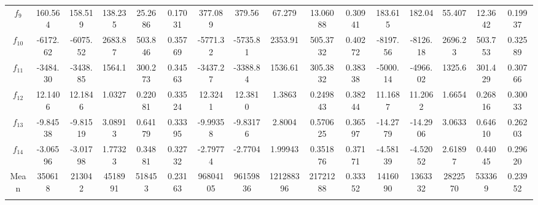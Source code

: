 \documentclass[paper=a4, fontsize=11pt]{scrartcl} %
\numberwithin{equation}{section} %
\numberwithin{figure}{section} %
\numberwithin{table}{section} %
\begin{document}
\begin{landscape}
\begin{table}
\begin{tabular}{c|ccccc|ccccc|ccccc}
			$f_{9}$  &  160.564 &  158.519 & 138.235 & 25.2686 & 0.17031 &  377.089 &  379.56  & 67.279  & 13.06088 & 0.30941 &  183.615 &  182.04  & 55.407  & 12.3642 & 0.19937\\
			$f_{10}$ & -6172.62 & -6075.52 & 2683.87 & 503.846 & 0.35769 & -5771.32 & -5735.81 & 2353.91 & 505.3732 & 0.40272 & -8197.56 & -8126.18 & 2696.23 & 503.753 & 0.32589\\
			$f_{11}$ & -3484.30 & -3438.85 & 1564.1  & 300.273 & 0.34563 & -3437.27 & -3388.84 & 1536.61 & 305.3832 & 0.38338 & -5000.14 & -4966.02 & 1325.6  & 301.429 & 0.30766\\
			$f_{12}$ &  12.1406 &  12.1846 & 1.0327  & 0.22081 & 0.33524 &  12.3241 &  12.3810 & 1.3863  & 0.249843 & 0.38244 &  11.1687 &  11.2062 & 1.6654  & 0.26816 & 0.30033\\
			$f_{13}$ & -9.84538 & -9.81519 & 3.08913 & 0.64179 & 0.33395 & -9.99358 & -9.83176 & 2.8004  & 0.570625 & 0.36597 & -14.2779 & -14.2906 & 3.0633  & 0.64610 & 0.26203\\
			$f_{14}$ & -3.06596 & -3.01798 & 1.77323 & 0.34881 & 0.32732 & -2.79774 & -2.7704  & 1.99943 & 0.351876 & 0.37171 & -4.58139 & -4.52052 & 2.61897 & 0.44045 & 0.29620\\		
			
			\noalign{\smallskip}\hline\noalign{\smallskip}
			Mean & 350618 & 213042 & 4518991 & 518453 & 0.23163 & 96804105 & 96159836 & 121288396 & 21721288 & 0.33352 & 1416090 & 1363332 & 2822570 & 533369 & 0.23952\\
			\noalign{\smallskip}\hline\noalign{\smallskip}
			\multicolumn{16}{l}{\tiny $^1$ 3.2GHz AMD Ryzen 7 1700X, 16 GB RAM}
		\end{tabular}\label{DE_30}
	\end{table}




\end{landscape}
\end{document}
